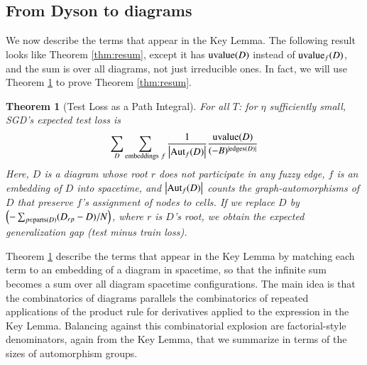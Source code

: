 \documentclass{article}
\theoremstyle{plain}
\newtheorem{thm}{Theorem}
\theoremstyle{definition}
\newcommand{\wrap}[1]{\left(#1\right)}
\newcommand{\wabs}[1]{\left|#1\right|}
\newcommand{\Aut}{\text{\textnormal{Aut}}}
\newcommand{\uvalue}{\text{\textnormal{uvalue}}}
\newcommand{\edges}{\text{\textnormal{edges}}}
\newcommand{\parts}{\text{\textnormal{parts}}}
\begin{document}
    \subsection{From Dyson to diagrams}                             \label{appendix:toward-diagrams}

        We now describe the terms that appear in the Key Lemma.  The following
        result looks like Theorem \ref{thm:resum}, except it has $\uvalue(D)$
        instead of $\uvalue_f(D)$, and the sum is over all diagrams, not just
        irreducible ones.  In fact, we will use Theorem \ref{thm:sgdcoef} to
        prove Theorem \ref{thm:resum}.

        \begin{thm}[Test Loss as a Path Integral] \label{thm:sgdcoef}
            For all $T$: for $\eta$ sufficiently small, SGD's expected test
            loss is
            \begin{equation*}\label{eq:sgdcoef}
                \sum_{D}
                    \sum_{\text{embeddings}~f}
                    \frac{1}{\wabs{\Aut_f(D)}}
                \frac{\uvalue(D)}{(-B)^{|\edges(D)|}}
            \end{equation*}
            Here, $D$ is a diagram whose root $r$ does not participate in
            any fuzzy edge, $f$ is an embedding of $D$ into spacetime, and
            $\wabs{\Aut_f(D)}$ counts the graph-automorphisms of $D$ that
            preserve $f$'s assignment of nodes to cells.
            If we replace $D$ by 
            $
                \wrap{-\sum_{p \in \parts(D)} (D_{rp} - D)/N}
            $, where $r$ is $D$'s root,
            we obtain the expected generalization gap (test minus train loss).
        \end{thm}

        Theorem \ref{thm:sgdcoef} describe the terms that appear in the Key
        Lemma by matching each term to an embedding of a diagram in spacetime,
        so that the infinite sum becomes a sum over all diagram spacetime
        configurations.  The main idea is that the combinatorics of diagrams
        parallels the combinatorics of repeated applications of the product
        rule for derivatives applied to the expression in the Key Lemma.
        Balancing against this combinatorial explosion are factorial-style
        denominators, again from the Key Lemma, that we summarize in terms of
        the sizes of automorphism groups.
\end{document}
